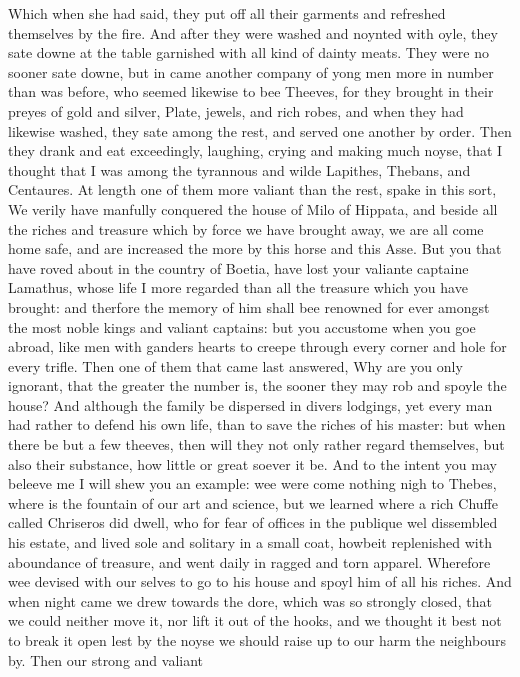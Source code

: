 Which when she had said, they put off all their garments and refreshed
themselves by the fire. And after they were washed and noynted with oyle, they
sate downe at the table garnished with all kind of dainty meats. They were no
sooner sate downe, but in came another company of yong men more in number than
was before, who seemed likewise to bee Theeves, for they brought in their
preyes of gold and silver, Plate, jewels, and rich robes, and when they had
likewise washed, they sate among the rest, and served one another by order.
Then they drank and eat exceedingly, laughing, crying and making much noyse,
that I thought that I was among the tyrannous and wilde Lapithes, Thebans, and
Centaures. At length one of them more valiant than the rest, spake in this
sort, We verily have manfully conquered the house of Milo of Hippata, and
beside all the riches and treasure which by force we have brought away, we are
all come home safe, and are increased the more by this horse and this Asse. But
you that have roved about in the country of Boetia, have lost your valiante
captaine Lamathus, whose life I more regarded than all the treasure which you
have brought: and therfore the memory of him shall bee renowned for ever
amongst the most noble kings and valiant captains: but you accustome when you
goe abroad, like men with ganders hearts to creepe through every corner and
hole for every trifle. Then one of them that came last answered, Why are you
only ignorant, that the greater the number is, the sooner they may rob and
spoyle the house? And although the family be dispersed in divers lodgings, yet
every man had rather to defend his own life, than to save the riches of his
master: but when there be but a few theeves, then will they not only rather
regard themselves, but also their substance, how little or great soever it be.
And to the intent you may beleeve me I will shew you an example: wee were come
nothing nigh to Thebes, where is the fountain of our art and science, but we
learned where a rich Chuffe called Chriseros did dwell, who for fear of offices
in the publique wel dissembled his estate, and lived sole and solitary in a
small coat, howbeit replenished with aboundance of treasure, and went daily in
ragged and torn apparel. Wherefore wee devised with our selves to go to his
house and spoyl him of all his riches. And when night came we drew towards the
dore, which was so strongly closed, that we could neither move it, nor lift it
out of the hooks, and we thought it best not to break it open lest by the noyse
we should raise up to our harm the neighbours by. Then our strong and valiant
